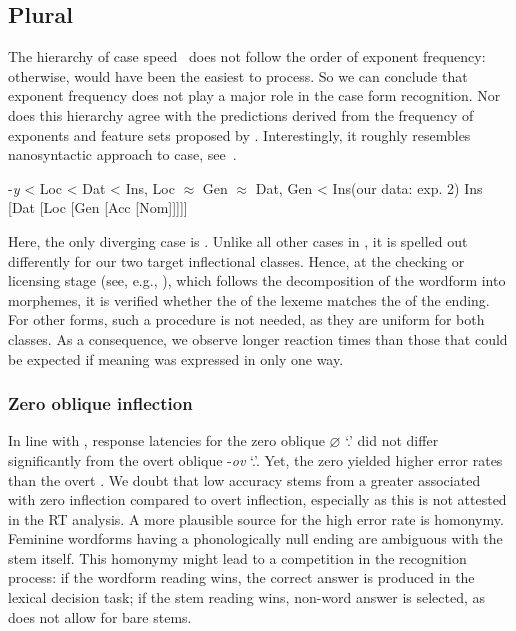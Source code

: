 \documentclass[output=paper, modfonts,newtxmath,hidelinks]{langscibook}
\begin{document}
\subsection{Plural} 
The hierarchy of  case  speed~ does not follow the order of exponent frequency: otherwise,  would have been the easiest to process. So we can conclude that exponent frequency does not play a major role in the case form recognition. Nor does this hierarchy agree with the predictions derived from the frequency of exponents and feature sets proposed by \citet{muller2004decomposing, wiese2004categories, wunderlich2004there}. Interestingly, it roughly resembles  nanosyntactic approach to  case, see~.

\ea \ea	\label{ex:plHierarchy} -\textit{y} < Loc < Dat < Ins, Loc $\approx$ Gen $\approx$ Dat, Gen < Ins\hfill (our data: exp. 2)
    \ex \label{ex:cahafunc} \ob Ins [Dat [Loc [Gen [Acc [Nom]]]]]\cb
    \z 
\z

\noindent Here, the only diverging case is . Unlike all other cases in , it is spelled out differently for our two target inflectional classes. Hence, at the checking or licensing stage (see, e.g., \citealt{bertram2000role}), which follows the decomposition of the wordform into morphemes,  it is verified whether the  of the lexeme matches the  of the ending. For other  forms, such a procedure is not needed, as they are uniform for both classes. As a consequence, we observe longer reaction times than those that could be expected if   meaning was expressed in only one way.

\subsubsection{{Zero oblique inflection}}
In line with \citet{gor2017processing}, response latencies for the zero oblique \textit{$\varnothing$} `\genn.\pl' did not differ significantly from the overt oblique -\textit{ov} `\genn.\pl'. Yet, the zero  yielded higher error rates than the overt . We doubt that low accuracy stems from a greater  associated with zero inflection compared to overt inflection, especially as this is not attested in the RT analysis. A more plausible source for the high error rate is homonymy. Feminine   wordforms having a phonologically null ending are ambiguous with the stem itself. This homonymy might lead to a competition in the recognition process: if the wordform reading wins, the correct answer is produced in the lexical decision task; if the stem reading wins, non-word answer is selected, as  does not allow for bare stems.
\end{document}
